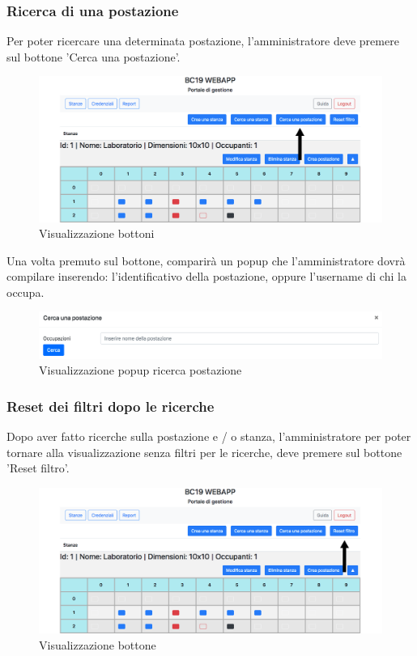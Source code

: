 \subsubsection{Ricerca di una postazione}
Per poter ricercare una determinata postazione, l'amministratore deve premere sul bottone 'Cerca una postazione'.
\begin{figure}[H]
	\centering
	\includegraphics[width=15cm]{res/images/bottoneSearchWorkstation.png}
	\caption{Visualizzazione bottoni}
\end{figure}
Una volta premuto sul bottone, comparirà un popup che l'amministratore dovrà compilare inserendo:
l'identificativo della postazione, oppure l'username di chi la occupa.
\begin{figure}[H]
	\centering
	\includegraphics[width=15cm]{res/images/searchWorkstation.png}
	\caption{Visualizzazione popup ricerca postazione}
\end{figure}

\subsubsection{Reset dei filtri dopo le ricerche}
Dopo aver fatto ricerche sulla postazione e / o stanza, l'amministratore per poter tornare alla visualizzazione senza filtri per le ricerche, deve premere sul bottone 'Reset filtro'.
\begin{figure}[H]
	\centering
	\includegraphics[width=15cm]{res/images/resetFiltri.png}
	\caption{Visualizzazione bottone}
\end{figure}

